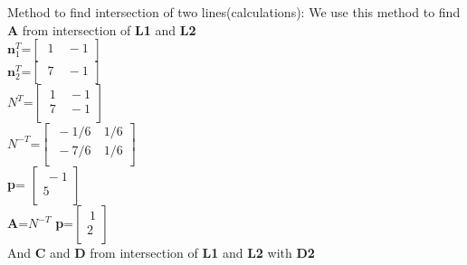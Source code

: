 \documentclass{beamer}
\begin{document}
\begin{frame}{Method to find intersection of two lines(calculations):}
We use this method to find \textbf{A} from intersection of \textbf{L1} and \textbf{L2}\\
$\textbf{n}_1^T $=$\begin{bmatrix}
  \ 1 &\ -1 \\
\end{bmatrix} $
\\
 
 $\textbf{n}_2^T$=$\begin{bmatrix}
  \ 7 &\ -1 \\
\end{bmatrix} $\\
$N^T$=$\begin{bmatrix}
  \ 1 &\ -1 \\
  \ 7 &\ -1 \\
\end{bmatrix}$ \\ 
 $N^{-T}$=$\begin{bmatrix}
  \ -1/6 &\ 1/6 \\
  \ -7/6 &\ 1/6 \\
\end{bmatrix} $\\

\textbf{p}= $\begin{bmatrix}
  \ -1 \\ 5 \\
\end{bmatrix} $ \\

\textbf{A}=$ N^{-T} $ \textbf{p}=$ \begin{bmatrix}
  \ 1 \\ 2 \\
\end{bmatrix} $ \\

And \textbf{C} and \textbf{D} from intersection of \textbf{L1} and \textbf{L2} with \textbf{D2}


\end{frame}
\end{document}
